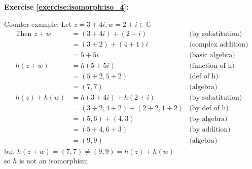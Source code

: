 \noindent\textbf{Exercise \ref{exercise:isomorph:iso_4}:}
\begin{figure}[H]
\end{figure}
Counter example: Let $z = 3 + 4i, w = 2 + i \in {\mathbb C}$
\begin{align*}
\text{Then\ } z + w &= (3 + 4i) + (2 + i) &\text{(by substitution)}
\\
&= (3 + 2) + (4 + 1)i &\text{(complex addition)}
\\
&= 5 + 5i &\text{(basic algebra)}
\\
h(z + w) &= h(5 + 5i) &\text{(function of h)}
\\
&= (5 + 2, 5 + 2) &\text{(def of h)}
\\
&= (7, 7) &\text{(algebra)}
\\
h(z) + h(w) &= h(3 + 4i) + h(2 + i) &\text{(by substitution)}
\\
&= (3 + 2, 4 + 2) + (2 + 2, 1 + 2) &\text{(by def of h)}
\\
&= (5, 6) + (4, 3) &\text{(by algebra)}
\\
&= (5 + 4, 6 + 3) &\text{(by addition)}
\\
&= (9, 9) &\text{(algebra)}
\end{align*}
but $h(z + w) = (7, 7) \neq (9, 9) = h(z) + h(w)$
\\
so $h$ is not an isomorphism
\\
\\

